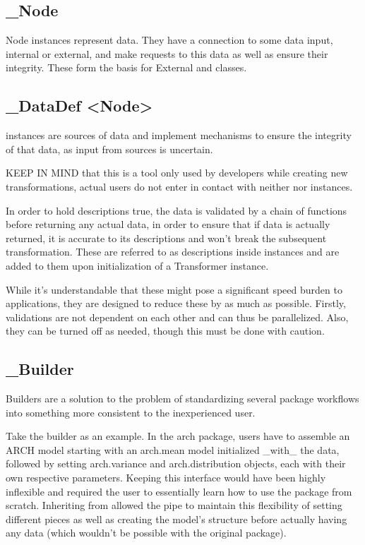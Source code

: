 \documentclass[letterpaper,10pt,english]{sphinxmanual}
\begin{document}
\subsection{\_Node}
\label{\detokenize{developers-guide:node}}
Node instances represent data. They have a connection to some data input, internal or external, and make requests to this data as well as ensure their integrity. These form the basis for External and  classes.


\subsection{\_DataDef \textless{}Node\textgreater{}}
\label{\detokenize{developers-guide:datadef-node}}
 instances are sources of data and implement mechanisms to ensure the integrity of that data, as input from sources is uncertain.

KEEP IN MIND that this is a tool only used by developers while creating new transformations, actual users do not enter in contact with neither  nor  instances.

 In order to hold descriptions true, the data is validated by a chain of  functions before returning any actual data, in order to ensure that if data is actually returned, it is accurate to its descriptions and won’t break the subsequent transformation. These are referred to as descriptions inside  instances and are added to them upon initialization of a Transformer instance.

 While it’s understandable that these might pose a significant speed burden to applications, they are designed to reduce these by as much as possible. Firstly, validations are not dependent on each other and can thus be parallelized. Also, they can be turned off as needed, though this must be done with caution.


\subsection{\_Builder}
\label{\detokenize{developers-guide:builder}}
Builders are a solution to the problem of standardizing several package workflows into something more consistent to the inexperienced user.

Take the  builder as an example. In the arch package, users have to assemble an ARCH model starting with an arch.mean model initialized \_with\_ the data, followed by setting arch.variance and arch.distribution objects, each with their own respective parameters. Keeping this interface would have been highly inflexible and required the user to essentially learn how to use the package from scratch. Inheriting from  allowed the  pipe to maintain this flexibility of setting different pieces as well as creating the model’s structure before actually having any data (which wouldn’t be possible with the original package).
\end{document}
